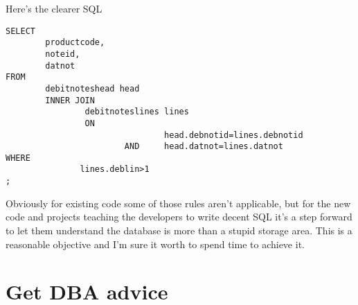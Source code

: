 Here's the clearer SQL
\begin{verbatim}
SELECT
        productcode,
        noteid,
        datnot
FROM
        debitnoteshead head
        INNER JOIN
                debitnoteslines lines
                ON
                                head.debnotid=lines.debnotid
                        AND     head.datnot=lines.datnot
WHERE
               lines.deblin>1
;
\end{verbatim}

Obviously for existing code some of those rules aren't applicable, but for the new code and 
projects teaching the developers to write decent SQL it's a step forward to let them understand the 
database is more than a stupid storage area.
This is a reasonable objective and I'm sure it worth to spend time to achieve it.


\section{Get DBA advice}
\label{sec:GETDBA}